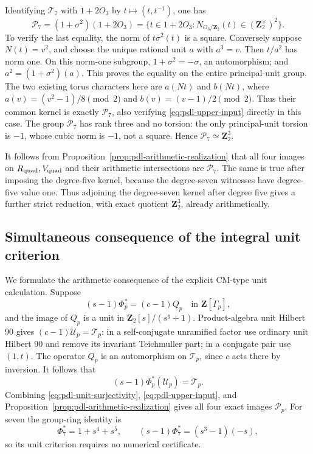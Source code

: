 Identifying \(\mathcal T_7\) with \(1+2O_3\) by
\(t\mapsto(t,t^{-1})\), one has
\[
 \mathcal P_7=(1+\sigma^2)(1+2O_3)
  =\{t\in1+2O_3:N_{O_3/\mathbf Z_2}(t)
                                  \in(\mathbf Z_2^\times)^2\}.
\]
To verify the last equality, the norm of
\(t\sigma^2(t)\) is a square. Conversely suppose
\(N(t)=v^2\), and choose the unique rational unit \(a\)
with \(a^3=v\). Then \(t/a^2\) has norm one. On this
norm-one subgroup, \(1+\sigma^2=-\sigma\), an
automorphism; and \(a^2=(1+\sigma^2)(a)\).
This proves the equality on the entire principal-unit group.
The two existing torus characters here are
\(a(Nt)\) and \(b(Nt)\), where
\(a(v)=(v^2-1)/8\pmod2\) and \(b(v)=(v-1)/2\pmod2\).
Thus their common kernel is exactly \(\mathcal P_7\),
also verifying \eqref{eq:pdl-upper-input} directly in this case.
The group \(\mathcal P_7\) has rank three and no torsion:
the only principal-unit torsion is \(-1\), whose cubic
norm is \(-1\), not a square. Hence
\(\mathcal P_7\simeq\mathbf Z_2^3\).

It follows from Proposition~\ref{prop:pdl-arithmetic-realization}
that all four images on \(R_{\rm quad},V_{\rm quad}\)
and their arithmetic intersections are \(\mathcal P_7\).
The same is true after imposing the degree-five kernel,
because the degree-seven witnesses have degree-five value one.
Thus adjoining the degree-seven kernel after degree five
gives a further strict reduction, with exact quotient
\(\mathbf Z_2^3\), already arithmetically.

\subsection{Simultaneous consequence of the integral unit criterion}

We formulate the arithmetic consequence of the explicit
CM-type unit calculation. Suppose
\[
 (s-1)\Phi_p^*=(c-1)Q_p
       \quad\text{in }\mathbf Z[\Gamma_p],
\]
and the image of \(Q_p\) is a unit in
\(\mathbf Z_2[s]/(s^g+1)\). Product-algebra unit Hilbert
90 gives \((c-1)\mathcal U_p=\mathcal T_p\): in a
self-conjugate unramified factor use ordinary unit
Hilbert 90 and remove its invariant Teichmuller part;
in a conjugate pair use \((1,t)\).
The operator \(Q_p\) is an automorphism on
\(\mathcal T_p\), since \(c\) acts there by inversion.
It follows that
\begin{equation}\label{eq:pdl-unit-surjectivity}
                     (s-1)\Phi_p^*(\mathcal U_p)=\mathcal T_p.
\end{equation}
Combining \eqref{eq:pdl-unit-surjectivity},
\eqref{eq:pdl-upper-input}, and
Proposition~\ref{prop:pdl-arithmetic-realization} gives
all four exact images \(\mathcal P_p\).
For seven the group-ring identity is
\[
 \Phi_7^*=1+s^4+s^5,\qquad
 (s-1)\Phi_7^*=(s^3-1)(-s),
\]
so its unit criterion requires no numerical certificate.


